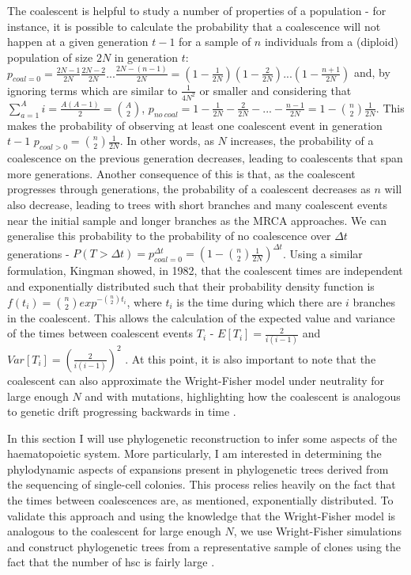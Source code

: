 The coalescent is helpful to study a number of properties of a population - for instance, it is possible to calculate the probability that a coalescence will not happen at a given generation $t-1$ for a sample of $n$ individuals from a (diploid) population of size $2N$ in generation $t$: $p_{coal=0} = \frac{2N-1}{2N}\frac{2N-2}{2N}...\frac{2N-(n-1)}{2N} = (1 - \frac{1}{2N})(1 - \frac{2}{2N})...(1 - \frac{n+1}{2N})$ and, by ignoring terms which are similar to $\frac{1}{4N^2}$ or smaller and considering that $\sum^A_{a=1}{i} = \frac{A(A-1)}{2} = \binom{A}{2}$, $p_{no\ coal} = 1 - \frac{1}{2N} - \frac{2}{2N} -...- \frac{n-1}{2N} = 1 - \binom{n}{2}\frac{1}{2N}$. This makes the probability of observing at least one coalescent event in generation $t-1$ $p_{coal>0} = \binom{n}{2}\frac{1}{2N}$. In other words, as $N$ increases, the probability of a coalescence on the previous generation decreases, leading to coalescents that span more generations. Another consequence of this is that, as the coalescent progresses through generations, the probability of a coalescent decreases as $n$ will also decrease, leading to trees with short branches and many coalescent events near the initial sample and longer branches as the MRCA approaches. We can generalise this probability to the probability of no coalescence over $\Delta t$ generations - $P(T > \Delta t) = p_{coal=0}^{\Delta t} = (1-\binom{n}{2}\frac{1}{2N})^{\Delta t}$. Using a similar formulation, Kingman showed, in 1982, that the coalescent times are independent and exponentially distributed such that their probability density function is $f(t_i) = \binom{n}{2}exp^{-\binom{n}{2}t_i}$, where $t_i$ is the time during which there are $i$ branches in the coalescent. This allows the calculation of the expected value and variance of the times between coalescent events $T_i$ - $E[T_i] = \frac{2}{i(i-1)}$ and $Var[T_i] = (\frac{2}{i(i-1)})^2$ \cite{Kingman1982-tc}. At this point, it is also important to note that the coalescent can also approximate the Wright-Fisher model under neutrality for large enough $N$ and with mutations, highlighting how the coalescent is analogous to genetic drift progressing backwards in time \cite{Wakeley2008-wh}.

In this section I will use phylogenetic reconstruction to infer some aspects of the haematopoietic system. More particularly, I am interested in determining the phylodynamic aspects of expansions present in phylogenetic trees derived from the sequencing of single-cell colonies. This process relies heavily on the fact that the times between coalescences are, as mentioned, exponentially distributed. To validate this approach and using the knowledge that the Wright-Fisher model is analogous to the coalescent for large enough $N$, we use Wright-Fisher simulations and construct phylogenetic trees from a representative sample of clones using the fact that the number of \ac{hsc} is fairly large \cite{Lee-Six2018-lp,Watson2020-pz}.

